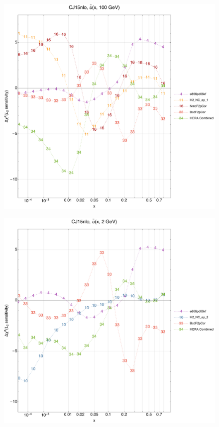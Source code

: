 \documentclass[10pt,aps,prd,floatfix,titlepage]{revtex4}
\begin{document}
\clearpage
\begin{figure}
\includegraphics[width=\textwidth,height=0.44\textheight,keepaspectratio]{1/ifl-2_CJ15nlo_L2_q100_Sf_1.pdf}
\caption{}
\end{figure}
\begin{figure}
\includegraphics[width=\textwidth,height=0.44\textheight,keepaspectratio]{1/ifl-2_CJ15nlo_L2_q2_Sf_1.pdf}
\caption{}
\end{figure}
\end{document}
